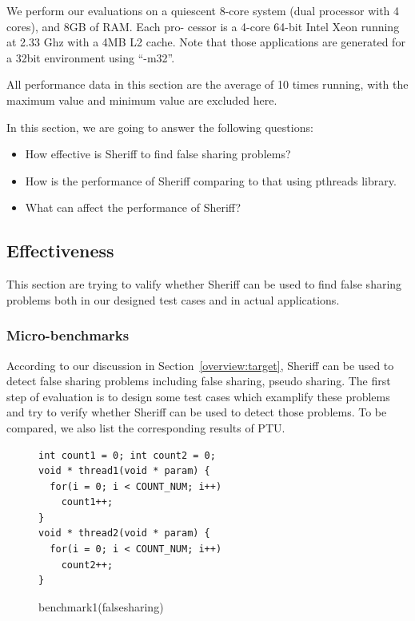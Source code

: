 \label{sec:evaluation}

We perform our evaluations on a quiescent 8-core system
(dual processor with 4 cores), and 8GB of RAM. Each pro-
cessor is a 4-core 64-bit Intel Xeon running at 2.33 Ghz
with a 4MB L2 cache. Note that those applications are generated
for a 32bit environment using ``-m32''. 

All performance data in this section are the average of 10 times running, with the maximum value and minimum value are 
excluded here.

In this section, we are going to answer the following questions:
\begin{itemize}
\item How effective is Sheriff to find false sharing problems?
\item How is the performance of Sheriff comparing to that using pthreads library.
\item What can affect the performance of Sheriff?
\end{itemize}

\subsection{Effectiveness}
This section are trying to valify whether Sheriff can be used to find false sharing problems both in 
our designed test cases and in actual applications. 

\subsubsection{Micro-benchmarks}
According to our discussion in Section~\ref{overview:target}, 
Sheriff can be used to detect false sharing problems including false sharing, pseudo sharing. 
The first step of evaluation is to design some test cases which examplify these problems and try to verify whether Sheriff
can be used to detect those problems. To be compared, we also list the corresponding results of PTU.
\begin{figure}[!t]
\begin{lstlisting}
int count1 = 0; int count2 = 0;
void * thread1(void * param) {
  for(i = 0; i < COUNT_NUM; i++)
    count1++;		
}
void * thread2(void * param) {
  for(i = 0; i < COUNT_NUM; i++)
    count2++;       
}
\end{lstlisting}
\caption{benchmark1(falsesharing)   
\label{fig:benchmark1}}
\end{figure}

